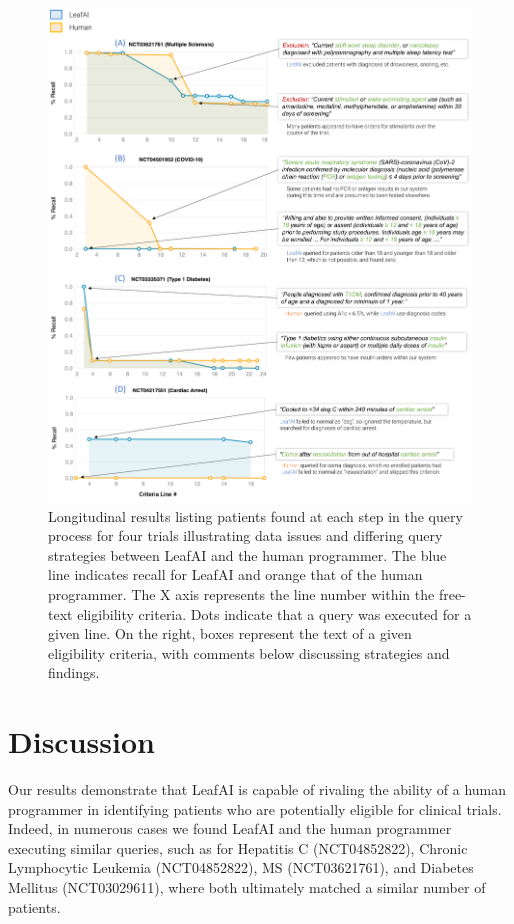 \documentclass[../main.tex]{subfiles}
\begin{document}
\begin{figure}[h!]
  \begin{center}
    \includegraphics[scale=0.54]{Figures/7_query_generation/leafai_analysis.pdf}  
  \end{center}
  \caption{Longitudinal results listing patients found at each step in the query process for four trials illustrating data issues and differing query strategies between LeafAI and the human programmer. The blue line indicates recall for LeafAI and orange that of the human programmer. The X axis represents the line number within the free-text eligibility criteria. Dots indicate that a query was executed for a given line. On the right, boxes represent the text of a given eligibility criteria, with comments below discussing strategies and findings.}
  \label{fig_leafai_results_analysis}
\end{figure}

\section{Discussion}

Our results demonstrate that LeafAI is capable of rivaling the ability of a human programmer in identifying patients who are potentially eligible for  clinical trials. Indeed, in numerous cases we found LeafAI and the human programmer executing similar queries, such as for Hepatitis C (NCT04852822), Chronic Lymphocytic Leukemia (NCT04852822), MS (NCT03621761), and Diabetes Mellitus (NCT03029611), where both ultimately matched a similar number of patients.
\end{document}
